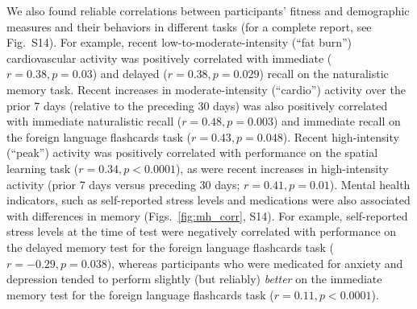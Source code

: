 \documentclass[10pt]{article}
\newcommand{\allCorr}{S14}
\begin{document}
We also found reliable correlations between participants' fitness and
demographic measures and their behaviors in different tasks
(for a complete report, see Fig.~\allCorr).  For example, recent
low-to-moderate-intensity (``fat burn'') 
cardiovascular activity was positively
correlated with immediate ($r = 0.38, p = 0.03$) and delayed ($r =
0.38, p = 0.029$) recall on the naturalistic
memory task.  Recent increases in moderate-intensity (``cardio'')
activity over the prior 7 days (relative to the preceding 30 days) was
also positively correlated with immediate naturalistic recall ($r =
0.48, p = 0.003$) and immediate recall on the foreign language
flashcards task ($r = 0.43, p = 0.048$).  Recent high-intensity
(``peak'') activity was positively correlated with performance on the
spatial learning task ($r = 0.34, p < 0.0001$), as were recent increases
in high-intensity activity (prior 7 days versus preceding 30 days; $r
= 0.41, p = 0.01$).  Mental health indicators, such as self-reported
stress levels and medications were also associated with differences in
memory (Figs.~\ref{fig:mh_corr}, \allCorr).  For example, self-reported stress levels at the time of test
were negatively correlated with performance on the delayed memory test
for the foreign language flashcards task ($r = -0.29, p = 0.038$),
whereas participants who were medicated for anxiety and depression
tended to perform slightly (but reliably) \textit{better} on the immediate memory test for the
foreign language flashcards task ($r = 0.11, p < 0.0001$).
\end{document}
